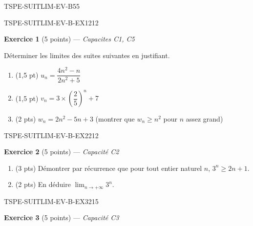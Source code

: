 \begin{evaluation}{TSPE-SUITLIM-EV-B}{55}


\begin{exercice}{TSPE-SUITLIM-EV-B-EX1}{2}{12}

\textbf{Exercice 1} (5 points) — \textit{Capacites C1, C5}

\medskip

Déterminer les limites des suites suivantes en justifiant.

\begin{enumerate}
  \item (1,5 pt) $u_n = \dfrac{4n^2 - n}{2n^2 + 5}$
  \item (1,5 pt) $v_n = 3 \times \left(\dfrac{2}{5}\right)^n + 7$
  \item (2 pts) $w_n = 2n^2 - 5n + 3$ (montrer que $w_n \geq n^2$ pour $n$ assez grand)
\end{enumerate}

\end{exercice}


\begin{exercice}{TSPE-SUITLIM-EV-B-EX2}{2}{12}

\textbf{Exercice 2} (5 points) — \textit{Capacité C2}

\medskip

\begin{enumerate}
  \item (3 pts) Démontrer par récurrence que pour tout entier naturel $n$, $3^n \geq 2n + 1$.
  \item (2 pts) En déduire $\lim_{n \to +\infty} 3^n$.
\end{enumerate}

\end{exercice}


\begin{exercice}{TSPE-SUITLIM-EV-B-EX3}{2}{15}

\textbf{Exercice 3} (5 points) — \textit{Capacité C3}


\end{exercice}
\end{evaluation}
